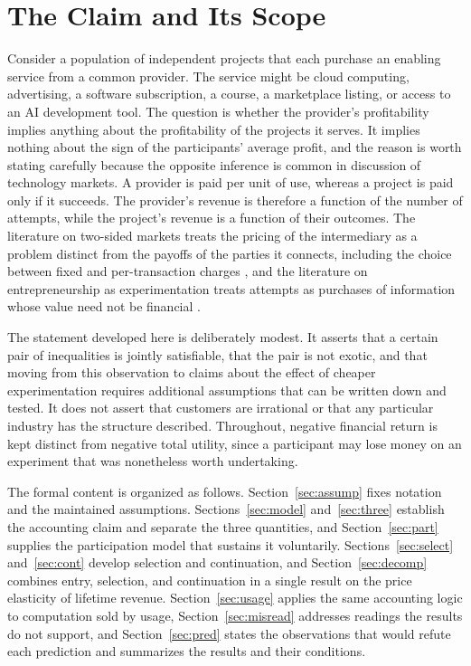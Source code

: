 \documentclass[11pt]{article}
\theoremstyle{remark}
\begin{document}
\clearpage

\section{The Claim and Its Scope}

Consider a population of independent projects that each purchase an enabling service from a common provider. The service might be cloud computing, advertising, a software subscription, a course, a marketplace listing, or access to an AI development tool. The question is whether the provider's profitability implies anything about the profitability of the projects it serves. It implies nothing about the sign of the participants' average profit, and the reason is worth stating carefully because the opposite inference is common in discussion of technology markets. A provider is paid per unit of use, whereas a project is paid only if it succeeds. The provider's revenue is therefore a function of the number of attempts, while the project's revenue is a function of their outcomes. The literature on two-sided markets treats the pricing of the intermediary as a problem distinct from the payoffs of the parties it connects, including the choice between fixed and per-transaction charges \cite{rochet2003,armstrong2006,rochet2006}, and the literature on entrepreneurship as experimentation treats attempts as purchases of information whose value need not be financial \cite{kerr2014}.

The statement developed here is deliberately modest. It asserts that a certain pair of inequalities is jointly satisfiable, that the pair is not exotic, and that moving from this observation to claims about the effect of cheaper experimentation requires additional assumptions that can be written down and tested. It does not assert that customers are irrational or that any particular industry has the structure described. Throughout, negative financial return is kept distinct from negative total utility, since a participant may lose money on an experiment that was nonetheless worth undertaking.

The formal content is organized as follows. Section~\ref{sec:assump} fixes notation and the maintained assumptions. Sections~\ref{sec:model} and~\ref{sec:three} establish the accounting claim and separate the three quantities, and Section~\ref{sec:part} supplies the participation model that sustains it voluntarily. Sections~\ref{sec:select} and~\ref{sec:cont} develop selection and continuation, and Section~\ref{sec:decomp} combines entry, selection, and continuation in a single result on the price elasticity of lifetime revenue. Section~\ref{sec:usage} applies the same accounting logic to computation sold by usage, Section~\ref{sec:misread} addresses readings the results do not support, and Section~\ref{sec:pred} states the observations that would refute each prediction and summarizes the results and their conditions.
\end{document}
